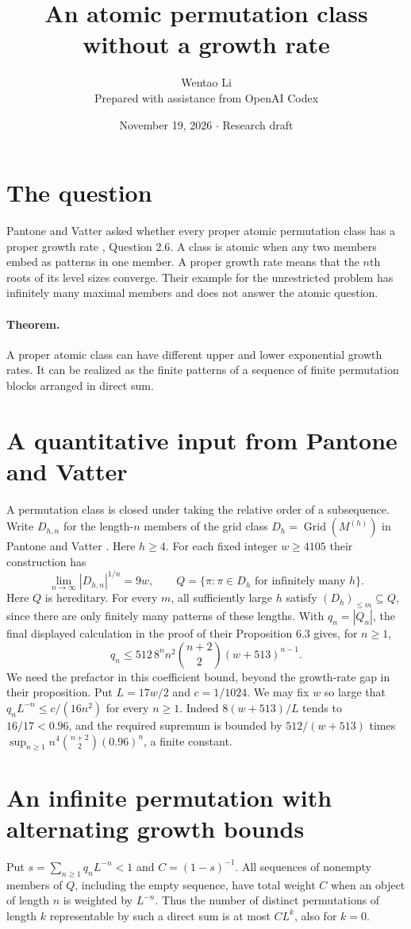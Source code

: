 \documentclass[11pt]{article}
\title{An atomic permutation class without a growth rate}
\author{Wentao Li\\{\small Prepared with assistance from OpenAI Codex}}
\date{November 19, 2026 \quad $\cdot$ \quad Research draft}
\begin{document}
\maketitle
\section*{The question}
Pantone and Vatter asked whether every proper atomic permutation class has a proper growth rate \cite{pv}, Question 2.6. A class is atomic when any two members embed as patterns in one member. A proper growth rate means that the $n$th roots of its level sizes converge. Their example for the unrestricted problem has infinitely many maximal members and does not answer the atomic question.

\paragraph{Theorem.} A proper atomic class can have different upper and lower exponential growth rates. It can be realized as the finite patterns of a sequence of finite permutation blocks arranged in direct sum.
\section*{A quantitative input from Pantone and Vatter}
A permutation class is closed under taking the relative order of a subsequence. Write $D_{h,n}$ for the length-$n$ members of the grid class $D_h=\operatorname{Grid}(M^{(h)})$ in Pantone and Vatter \cite{pv}. Here $h\ge4$. For each fixed integer $w\ge4105$ their construction has
\[
 \lim_{n\to\infty}|D_{h,n}|^{1/n}=9w,\qquad
 Q=\{\pi:\pi\in D_h\text{ for infinitely many }h\}.
\]
Here $Q$ is hereditary. For every $m$, all sufficiently large $h$ satisfy $(D_h)_{\le m}\subseteq Q$, since there are only finitely many patterns of these lengths. With $q_n=|Q_n|$, the final displayed calculation in the proof of their Proposition 6.3 gives, for $n\ge1$,
\[
 q_n\le512\,8^n n^2 \binom{n+2}{2}(w+513)^{n-1}.
\]
We need the prefactor in this coefficient bound, beyond the growth-rate gap in their proposition. Put $L=17w/2$ and $c=1/1024$. We may fix $w$ so large that $q_nL^{-n}\le c/(16n^2)$ for every $n\ge1$. Indeed $8(w+513)/L$ tends to $16/17<0.96$, and the required supremum is bounded by $512/(w+513)$ times $\sup_{n\ge1} n^4\binom{n+2}{2}(0.96)^n$, a finite constant.

\section*{An infinite permutation with alternating growth bounds}
Put $s=\sum_{n\ge1}q_n L^{-n}<1$ and $C=(1-s)^{-1}$. All sequences of nonempty members of $Q$, including the empty sequence, have total weight $C$ when an object of length $n$ is weighted by $L^{-n}$. Thus the number of distinct permutations of length $k$ representable by such a direct sum is at most $C L^k$, also for $k=0$.
\end{document}
